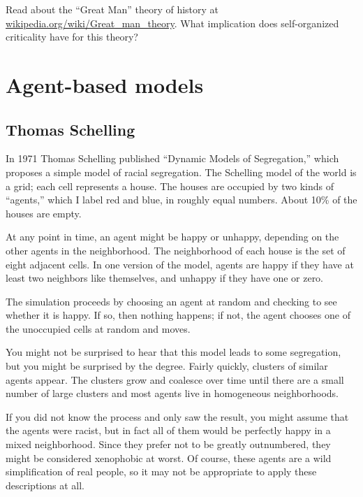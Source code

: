 \documentclass[10pt]{book}
\begin{document}
\begin{ex}

Read about the ``Great Man'' theory of history at
\url{wikipedia.org/wiki/Great_man_theory}.  What implication
does self-organized criticality have for this theory?

\end{ex}


\chapter{Agent-based models}

\section{Thomas Schelling}

In 1971 Thomas Schelling published ``Dynamic Models of Segregation,''
which proposes a simple model of racial segregation.  The Schelling
model of the world is a grid; each cell represents a
house.  The houses are occupied by two kinds of ``agents,'' which I
label red and blue, in roughly equal numbers.  About 10\% of the
houses are empty.

At any point in time, an agent might be happy or unhappy, depending
on the other agents in the neighborhood.
The neighborhood of each house is the set of
eight adjacent cells.
In one version of the model, agents are happy if they have at least
two neighbors like themselves, and unhappy if they have one or zero.

The simulation proceeds by choosing an agent at random and checking
to see whether it is happy.  If so, then nothing happens; if not,
the agent chooses one of the unoccupied cells at
random and moves.

You might not be surprised to hear that this model leads to some
segregation, but you might be surprised by the degree.  Fairly
quickly, clusters of similar agents appear.  The clusters
grow and coalesce over time until there are a small number
of large clusters and most agents live in homogeneous
neighborhoods.

If you did not know the process and only saw the result, you might
assume that the agents were racist, but in fact all of them
would be perfectly happy in a mixed neighborhood.  Since they prefer
not to be greatly outnumbered, they might be considered xenophobic at
worst.  Of course, these agents are a wild simplification of real
people, so it may not be appropriate to apply these descriptions at
all.
\end{document}

